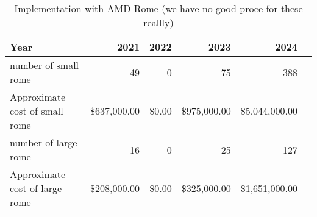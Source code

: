 \tiny \begin{longtable} { |p{}  |r  |r  |r  |r  |r |} 
\caption{Implementation with AMD Rome (we have no good proce for these reallly) \label{tab:Rome}}\\ 
\hline 
\textbf{Year}&\textbf{2021}&\textbf{2022}&\textbf{2023}&\textbf{2024} \\ \hline
{number of small rome }&{49}&{0}&{75}&{388} \\ \hline
{Approximate cost of small rome }&{\$637,000.00}&{\$0.00}&{\$975,000.00}&{\$5,044,000.00} \\ \hline
{number of large rome }&{16}&{0}&{25}&{127} \\ \hline
{Approximate cost of large rome }&{\$208,000.00}&{\$0.00}&{\$325,000.00}&{\$1,651,000.00} \\ \hline
\end{longtable} \normalsize
